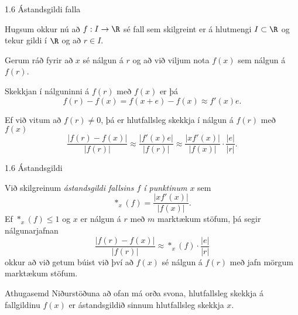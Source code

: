 \begin{frame}{1.6 Ástandsgildi falla} 

Hugsum okkur nú að $f: I\to \R$ sé fall sem skilgreint er á hlutmengi 
$I\subset \R$ og tekur gildi í $\R$ og að  $r\in I$. \pause

Gerum ráð fyrir að $x$ sé nálgun á $r$ 
og að við viljum nota $f(x)$ sem nálgun á $f(r)$. \pause

Skekkjan í nálguninni  á $f(r)$ með $f(x)$ er þá
\begin{equation*}
    f(r)-f(x) = f(x+e)-f(x)\approx f'(x)e.
\end{equation*}

\pause
Ef við vitum að $f(r)\neq 0$, þá er hlutfallsleg skekkja í nálgun á $f(r)$ með $f(x)$
\begin{equation*}
    \dfrac{|f(r)-f(x)|}{|f(r)|}\approx 
    \dfrac{|f'(x)e|}{|f(r)|}
    \approx\dfrac{|xf'(x)|}{|f(x)|}\cdot \dfrac{|e|}{|r|}.
\end{equation*}

\end{frame}
%

%
\begin{frame}{1.6 Ástandsgildi} 


Við skilgreinum {\it ástandsgildi fallsins $f$ í punktinum $x$} sem
\begin{equation*}
    \ast_x(f) = \dfrac{|xf'(x)|}{|f(x)|}.
\end{equation*}\pause
Ef $\ast_x(f)\leq 1$ og $x$ er nálgun á $r$ með $m$ marktækum stöfum,
þá segir nálgunarjafnan  
\begin{equation*}
    \dfrac{|f(r)-f(x)|}{|f(r)|} \approx 
    \ast_x(f)\cdot \dfrac{|e|}{|r|}
\end{equation*}
okkur að við getum búist við því að $f(x)$ sé nálgun á $f(r)$ með jafn
mörgum marktækum stöfum. 

\pause
\begin{block}{Athugasemd}
 Niðurstöðuna að ofan má orða svona, hlutfallsleg skekkja á fallgildinu
$f(x)$ er ástandsgildið sinnum hlutfallsleg skekkja $x$.
\end{block}

\end{frame}
%

